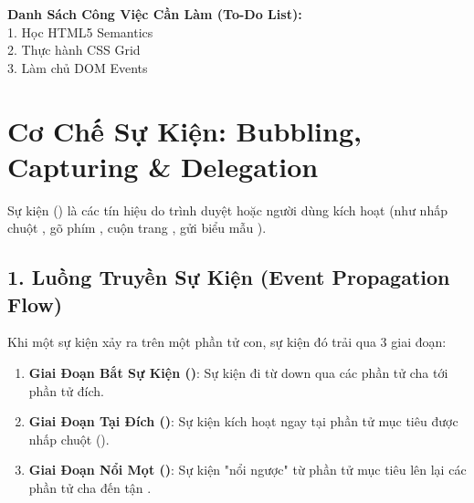 \begin{browserWindow}
\sffamily\small
\begin{tcolorbox}[colback=white, colframe=primaryBlue!30, arc=5pt, width=0.85\linewidth]
\textbf{\color{primaryBlue} Danh Sách Công Việc Cần Làm (To-Do List):}\\[4pt]
1. Học HTML5 Semantics \hfill {}\\[3pt]
2. Thực hành CSS Grid \hfill {}\\[3pt]
3. Làm chủ DOM Events \hfill {}
\end{tcolorbox}
\end{browserWindow}

\section{Cơ Chế Sự Kiện: Bubbling, Capturing \& Delegation}

Sự kiện () là các tín hiệu do trình duyệt hoặc người dùng kích hoạt (như nhấp chuột , gõ phím , cuộn trang , gửi biểu mẫu ).

\subsection{1. Luồng Truyền Sự Kiện (Event Propagation Flow)}

Khi một sự kiện xảy ra trên một phần tử con, sự kiện đó trải qua 3 giai đoạn:
\begin{enumerate}[leftmargin=1.5em, itemsep=4pt]
    \item \textbf{Giai Đoạn Bắt Sự Kiện ()}: Sự kiện đi từ  down qua các phần tử cha tới phần tử đích.
    \item \textbf{Giai Đoạn Tại Đích ()}: Sự kiện kích hoạt ngay tại phần tử mục tiêu được nhấp chuột ().
    \item \textbf{Giai Đoạn Nổi Mọt ()}: Sự kiện "nổi ngược" từ phần tử mục tiêu lên lại các phần tử cha đến tận .
\end{enumerate}

